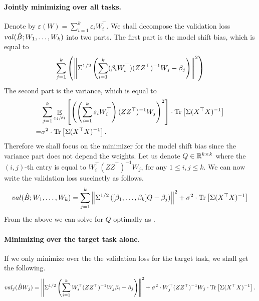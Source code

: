 \paragraph{Jointly minimizing over all tasks.}
Denote by $\varepsilon(W) = \sum_{i=1}^k \varepsilon_i W_i^{\top}$.
We shall decompose the validation loss $val(\hat{B}; W_1, \dots, W_k)$ into two parts.
The first part is the model shift bias, which is equal to
\begin{align*}
	\sum_{j=1}^k \left({\left\| \Sigma^{1/2}\left({\sum_{i=1}^k(\beta_i W_i^{\top}) (ZZ^{\top})^{-1} W_j - \beta_j}\right) \right\|^2}\right)
\end{align*}
The second part is the variance, which is equal to
\begin{align*}
	& \sum_{j=1}^k \mathop{\mathbb{E}}_{\varepsilon_i, \forall i}\left[ \left({\left({\sum_{i=1}^k \varepsilon_i W_i^{\top}}\right) (ZZ^{\top})^{-1} W_j}\right)^2 \right] \cdot {\operatorname{Tr}\left[\Sigma(X^{\top}X)^{-1}\right]} \\
	=& \sigma^2 \cdot \operatorname{Tr}\left[\Sigma (X^{\top}X)^{-1}\right].
\end{align*}
Therefore we shall focus on the minimizer for the model shift bias since the variance part does not depend the weights.
Let us denote $Q\in\mathbb{R}^{k\times k}$ where the $(i,j)$-th entry is equal to $W_i^{\top} (ZZ^{\top})^{-1} W_j$, for any $1\le i, j\le k$.
We can now write the validation loss succinctly as follows.
\begin{align*}
	val(\hat{B}; W_1, \dots, W_k) = \sum_{j=1}^k \left\| \Sigma^{1/2} \left({[\beta_1, \dots, \beta_k] Q - \beta_j}\right) \right\|^2 + \sigma^2 \cdot \operatorname{Tr}\left[\Sigma (X^{\top}X)^{-1}\right]
\end{align*}
From the above we can solve for $Q$ optimally as .

\paragraph{Minimizing over the target task alone.}
If we only minimize over the the validation loss for the target task, we shall get the following.
\begin{align*}
	val_j(\hat{B} W_j) = \left\| \Sigma^{1/2}\left({\sum_{i=1}^k W_i^{\top} (ZZ^{\top})^{-1}W_j \beta_i - \beta_j}\right) \right\|^2
	+ \sigma^2 \cdot W_j^{\top} (ZZ^{\top})^{-1} W_j \cdot \operatorname{Tr}\left[\Sigma (X^{\top}X)^{-1}\right].
\end{align*}
